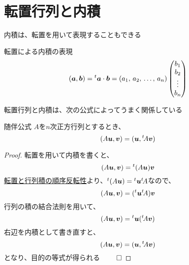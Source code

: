 \documentclass[../../../topic_linear-algebra]{subfiles}
\begin{document}
\sectionline
\section{転置行列と内積}

内積は、転置を用いて表現することもできる

\begin{theorem}{転置による内積の表現}
  \begin{equation*}
    (\vb*{a},\vb*{b}) = {}^t \vb*{a} \cdot \vb*{b} = \left(a_1,\,a_2,\,\ldots,\,a_n\right) \begin{pmatrix}
      b_1    \\
      b_2    \\
      \vdots \\
      b_n
    \end{pmatrix}
  \end{equation*}
\end{theorem}

\sectionline

転置行列と内積は、次の公式によってうまく関係している

\begin{theorem}{随伴公式}
  $A$を$n$次正方行列とするとき、
  \begin{equation*}
    (A\vb*{u},\vb*{v}) = (\vb*{u},{}^t\! A\vb*{v})
  \end{equation*}
\end{theorem}

\begin{proof}
  転置を用いて内積を書くと、
  \begin{equation*}
    (A\vb*{u},\vb*{v}) = {}^t(A\vb*{u}) \vb*{v}
  \end{equation*}
  \hyperref[thm:transpose-of-product]{転置と行列積の順序反転性}より、${}^t(A\vb*{u}) = {}^t\vb*{u} {}^t\! A$なので、
  \begin{equation*}
    (A\vb*{u},\vb*{v}) = ({}^t\vb*{u} {}^t\! A) \vb*{v}
  \end{equation*}
  行列の積の結合法則を用いて、
  \begin{equation*}
    (A\vb*{u},\vb*{v}) = {}^t\vb*{u} ({}^t\! A\vb*{v})
  \end{equation*}
  右辺を内積として書き直すと、
  \begin{equation*}
    (A\vb*{u},\vb*{v}) = (\vb*{u},{}^t\! A\vb*{v})
  \end{equation*}
  となり、目的の等式が得られる $\qed$
\end{proof}
\end{document}

